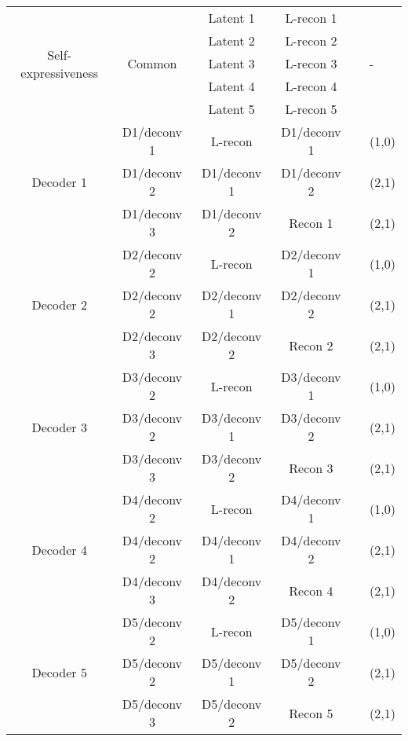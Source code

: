 \documentclass[journal]{IEEEtran}
\begin{document}
\begin{table}[htp!]
{\begin{tabular}{|c|c|c|c|l|  p{0.7cm}|}
			
			\multirow{5}{*}{Self-expressiveness}  & \multirow{5}{*}{Common } &  Latent 1   & L-recon 1  & \centering \multirow{5}{*}{ Parameters} & \multirow{5}{*}{-} \\
			\multirow{5}{*}{layer}&   &  Latent 2 &  L-recon 2  &    &   \\
			&   &  Latent 3 &  L-recon 3  &    &   \\
			&   &  Latent 4 &  L-recon 4  &    &   \\
			&   &  Latent 5 &  L-recon 5  &    &   \\	
\hline\hline	
			\multirow{3}{*}{Decoder 1}  & D1/deconv 1 &  L-recon   & D1/deconv 1  &   & (1,0) \\
			&    D1/deconv 2 &  D1/deconv 1  & D1/deconv 2  &   & (2,1) \\			
			&    D1/deconv 3 &  D1/deconv 2  & Recon 1  &   & (2,1) \\	
			\hline\hline
			\multirow{3}{*}{Decoder 2}  & D2/deconv 2 &  L-recon   & D2/deconv 1  &   & (1,0) \\
			&    D2/deconv 2 &  D2/deconv 1  & D2/deconv 2  &   & (2,1) \\			
			&    D2/deconv 3 &  D2/deconv 2  & Recon 2  &   & (2,1) \\	
			\hline\hline
			\multirow{3}{*}{Decoder 3}  & D3/deconv 2 &  L-recon   & D3/deconv 1  &   & (1,0) \\
			&    D3/deconv 2 &  D3/deconv 1  & D3/deconv 2  &   & (2,1) \\			
			&    D3/deconv 3 &  D3/deconv 2  & Recon 3  &   & (2,1) \\	
			\hline\hline
			\multirow{3}{*}{Decoder 4}  & D4/deconv 2 &  L-recon   & D4/deconv 1  &   & (1,0) \\
			&    D4/deconv 2 &  D4/deconv 1  & D4/deconv 2  &   & (2,1) \\			
			&    D4/deconv 3 &  D4/deconv 2  & Recon 4 &   & (2,1) \\	
			\hline\hline
			\multirow{3}{*}{Decoder 5}  & D5/deconv 2 &  L-recon   & D5/deconv 1  &   & (1,0) \\
			&    D5/deconv 2 &  D5/deconv 1  & D5/deconv 2  &   & (2,1) \\			
			&    D5/deconv 3 &  D5/deconv 2  & Recon 5 &   & (2,1) \\	
			\hline
			
		\end{tabular} 
	}
\end{table}
\end{document}
